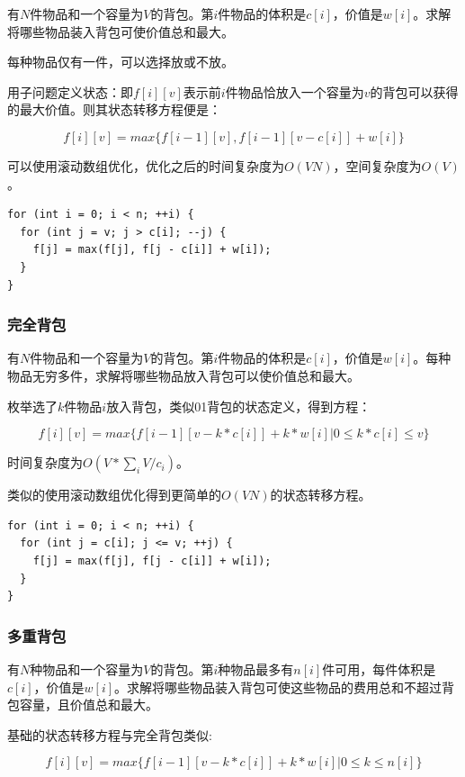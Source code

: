 \documentclass[11pt]{article}
\begin{document}
有\(N\)件物品和一个容量为\(V\)的背包。第\(i\)件物品的体积是\(c[i]\)，价值是\(w[i]\)。求解将哪些物品装入背包可使价值总和最大。

每种物品仅有一件，可以选择放或不放。

用子问题定义状态：即\(f[i][v]\)表示前\(i\)件物品恰放入一个容量为\(v\)的背包可以获得的最大价值。则其状态转移方程便是：

\[
f[i][v]=max\{f[i-1][v],f[i-1][v-c[i]]+w[i]\}
\]

可以使用滚动数组优化，优化之后的时间复杂度为\(O(VN)\)，空间复杂度为\(O(V)\)。

\begin{verbatim}
for (int i = 0; i < n; ++i) {
  for (int j = v; j > c[i]; --j) {
    f[j] = max(f[j], f[j - c[i]] + w[i]);
  }
}
\end{verbatim}

\subsubsection{完全背包}
\label{sec:orgb06426f}

有\(N\)件物品和一个容量为\(V\)的背包。第\(i\)件物品的体积是\(c[i]\)，价值是\(w[i]\)。每种物品无穷多件，求解将哪些物品放入背包可以使价值总和最大。

枚举选了\(k\)件物品\(i\)放入背包，类似01背包的状态定义，得到方程：

\[
f[i][v]=max\{f[i-1][v-k*c[i]]+k*w[i]|0 \leq k*c[i] \leq v\}
\]

时间复杂度为\(O(V*\sum_i V/c_i)\)。

类似的使用滚动数组优化得到更简单的\(O(VN)\)的状态转移方程。

\begin{verbatim}
for (int i = 0; i < n; ++i) {
  for (int j = c[i]; j <= v; ++j) {
    f[j] = max(f[j], f[j - c[i]] + w[i]);
  }
}
\end{verbatim}

\subsubsection{多重背包}
\label{sec:orgedc3eb7}

有\(N\)种物品和一个容量为\(V\)的背包。第\(i\)种物品最多有\(n[i]\)件可用，每件体积是\(c[i]\)，价值是\(w[i]\)。求解将哪些物品装入背包可使这些物品的费用总和不超过背包容量，且价值总和最大。

基础的状态转移方程与完全背包类似:

\[
f[i][v]=max\{f[i-1][v-k*c[i]]+k*w[i]|0 \leq k \leq n[i]\}
\]
\end{document}
